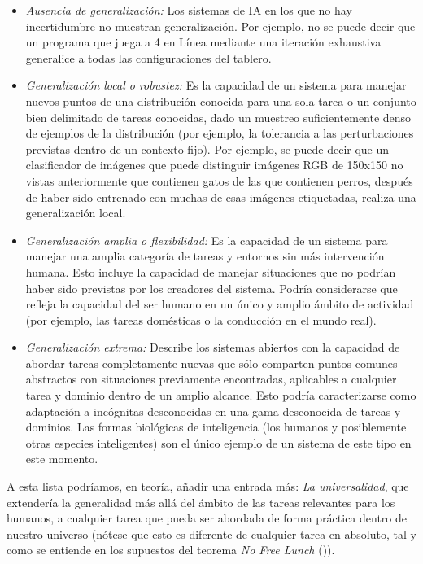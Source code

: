 \begin{itemize}
\item \textit{Ausencia de generalización:} Los sistemas de IA en los que no hay incertidumbre no muestran generalización. Por ejemplo, no se puede decir que un programa que juega a 4 en Línea mediante una iteración exhaustiva generalice a todas las configuraciones del tablero.

\item \textit{Generalización local o robustez:} Es la capacidad de un sistema para manejar nuevos puntos de una distribución conocida para una sola tarea o un conjunto bien delimitado de tareas conocidas, dado un muestreo suficientemente denso de ejemplos de la distribución (por ejemplo, la tolerancia a las perturbaciones previstas dentro de un contexto fijo). Por ejemplo, se puede decir que un clasificador de imágenes que puede distinguir imágenes RGB de 150x150 no vistas anteriormente que contienen gatos de las que contienen perros, después de haber sido entrenado con muchas de esas imágenes etiquetadas, realiza una generalización local. 

\item \textit{Generalización amplia o flexibilidad:} Es la capacidad de un sistema para manejar una amplia categoría de tareas y entornos sin más intervención humana. Esto incluye la capacidad de manejar situaciones que no podrían haber sido previstas por los creadores del sistema. Podría considerarse que refleja la capacidad del ser humano en un único y amplio ámbito de actividad (por ejemplo, las tareas domésticas o la conducción en el mundo real).

\item \textit{Generalización extrema:} Describe los sistemas abiertos con la capacidad de abordar tareas completamente nuevas que sólo comparten puntos comunes abstractos con situaciones previamente encontradas, aplicables a cualquier tarea y dominio dentro de un amplio alcance. Esto podría caracterizarse como adaptación a incógnitas desconocidas en una gama desconocida de tareas y dominios. Las formas biológicas de inteligencia (los humanos y posiblemente otras especies inteligentes) son el único ejemplo de un sistema de este tipo en este momento.
\end{itemize}

A esta lista podríamos, en teoría, añadir una entrada más: \textit{La universalidad}, que extendería la generalidad más allá del ámbito de las tareas relevantes para los humanos, a cualquier tarea que pueda ser abordada de forma práctica dentro de nuestro universo (nótese que esto es diferente de cualquier tarea en absoluto, tal y como se entiende en los supuestos del teorema \textit{No Free Lunch} (\cite{wolpert1997no})).

